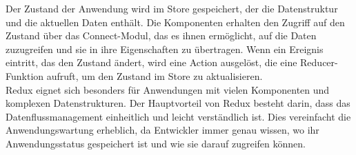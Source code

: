 Der Zustand der Anwendung wird im Store gespeichert, der die Datenstruktur und die aktuellen Daten enthält. Die Komponenten erhalten den Zugriff auf den Zustand über das Connect-Modul, das es ihnen ermöglicht, auf die Daten zuzugreifen und sie in ihre Eigenschaften zu übertragen. Wenn ein Ereignis eintritt, das den Zustand ändert, wird eine Action ausgelöst, die eine Reducer-Funktion aufruft, um den Zustand im Store zu aktualisieren.\\

Redux eignet sich besonders für Anwendungen mit vielen Komponenten und komplexen Datenstrukturen. Der Hauptvorteil von Redux besteht darin, dass das Datenflussmanagement einheitlich und leicht verständlich ist. Dies vereinfacht die Anwendungswartung erheblich, da Entwickler immer genau wissen, wo ihr Anwendungsstatus gespeichert ist und wie sie darauf zugreifen können.\\

